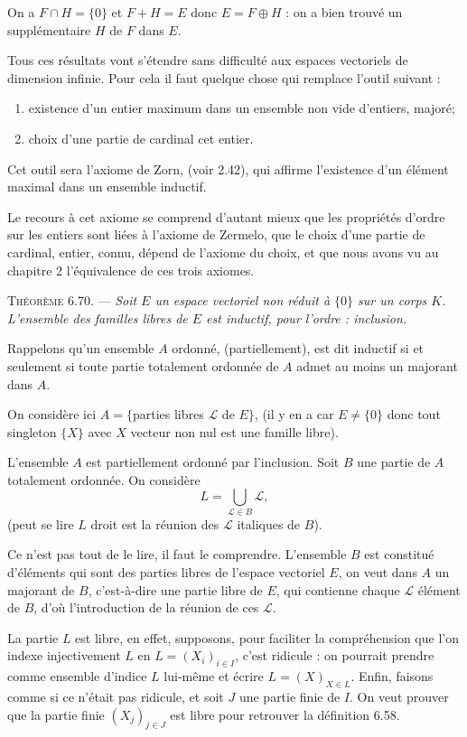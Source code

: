 On a $F\cap H=\{0\}$ et $F+H=E$ donc $E=F\oplus H$ : on a bien trouvé un supplémentaire $H$ de $F$ dans $E$. \bookend

Tous ces résultats vont s'étendre sans difficulté aux espaces vectoriels de dimension infinie. Pour cela il faut quelque chose qui remplace l'outil suivant :
\begin{enumerate}[label=\arabic*),leftmargin=2.1em]
\item existence d'un entier maximum dans un ensemble non vide d'entiers, majoré;
\item choix d'une partie de cardinal cet entier.
\end{enumerate}

Cet outil sera l'axiome de Zorn, (voir 2.42), qui affirme l'existence d'un élément maximal dans un ensemble inductif.

Le recours à cet axiome se comprend d'autant mieux que les propriétés d'ordre sur les entiers sont liées à l'axiome de Zermelo, que le choix d'une partie de cardinal, entier, connu, dépend de l'axiome du choix, et que nous avons vu au chapitre 2 l'équivalence de ces trois axiomes.

\medskip\noindent\textsc{Théorème 6.70.} --- \emph{Soit $E$ un espace vectoriel non réduit à $\{0\}$ sur un corps $K$. L'ensemble des familles libres de $E$ est inductif, pour l'ordre : inclusion.}

Rappelons qu'un ensemble $A$ ordonné, (partiellement), est dit inductif si et seulement si toute partie totalement ordonnée de $A$ admet au moins un majorant dans $A$.

On considère ici $A=\{$parties libres $\mathcal L$ de $E\}$, (il y en a car $E\ne\{0\}$ donc tout singleton $\{X\}$ avec $X$ vecteur non nul est une famille libre).

L'ensemble $A$ est partiellement ordonné par l'inclusion. Soit $B$ une partie de $A$ totalement ordonnée. On considère
\[
L=\bigcup_{\mathcal L\in B}\mathcal L,
\]
(peut se lire $L$ droit est la réunion des $\mathcal L$ italiques de $B$).

Ce n'est pas tout de le lire, il faut le comprendre. L'ensemble $B$ est constitué d'éléments qui sont des parties libres de l'espace vectoriel $E$, on veut dans $A$ un majorant de $B$, c'est-à-dire une partie libre de $E$, qui contienne chaque $\mathcal L$ élément de $B$, d'où l'introduction de la réunion de ces $\mathcal L$.

La partie $L$ est libre, en effet, supposons, pour faciliter la compréhension que l'on indexe injectivement $L$ en $L=(X_i)_{i\in I}$, c'est ridicule : on pourrait prendre comme ensemble d'indice $L$ lui-même et écrire $L=(X)_{X\in L}$. Enfin, faisons comme si ce n'était pas ridicule, et soit $J$ une partie finie de $I$. On veut prouver que la partie finie $(X_j)_{j\in J}$ est libre pour retrouver la définition 6.58.

